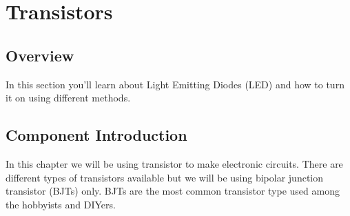 
\cleardoublepage
{}
\chapter{Transistors}

\section{Overview}
In this section you'll learn about Light Emitting Diodes (LED) and how to turn it on using different methods.

\section{Component Introduction}
In this chapter we will be using transistor to make electronic circuits. There are different types of transistors available but we will be using bipolar junction transistor (BJTs) only. BJTs are the most common transistor type used among the hobbyists and DIYers.

